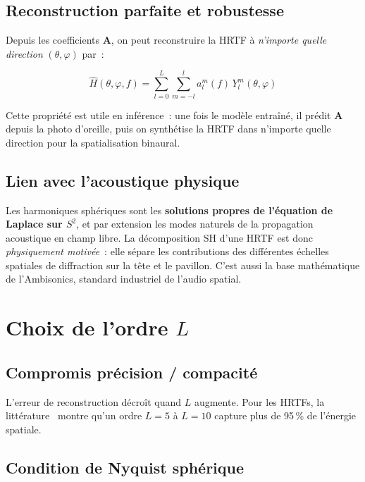 \documentclass[12pt, a4paper]{article}
\begin{document}
\subsection{Reconstruction parfaite et robustesse}

Depuis les coefficients $\mathbf{A}$, on peut reconstruire la HRTF à
\emph{n'importe quelle direction} $(\theta, \varphi)$ par~:

\begin{equation}
    \hat{H}(\theta, \varphi, f) = \sum_{l=0}^{L} \sum_{m=-l}^{l}
    a_l^m(f)\, Y_l^m(\theta, \varphi)
\end{equation}

Cette propriété est utile en inférence~: une fois le modèle entraîné, il prédit
$\mathbf{A}$ depuis la photo d'oreille, puis on synthétise la HRTF dans
n'importe quelle direction pour la spatialisation binaural.

\subsection{Lien avec l'acoustique physique}

Les harmoniques sphériques sont les \textbf{solutions propres de l'équation de
Laplace sur $S^2$}, et par extension les modes naturels de la propagation
acoustique en champ libre. La décomposition SH d'une HRTF est donc
\emph{physiquement motivée}~: elle sépare les contributions des différentes
échelles spatiales de diffraction sur la tête et le pavillon. C'est aussi la base
mathématique de l'Ambisonics, standard industriel de l'audio spatial.

\section{Choix de l'ordre $L$}

\subsection{Compromis précision / compacité}

L'erreur de reconstruction décroît quand $L$ augmente. Pour les HRTFs, la
littérature~\cite{Evans98, Zotkin09} montre qu'un ordre $L = 5$ à $L = 10$
capture plus de 95\,\% de l'énergie spatiale.

\subsection{Condition de Nyquist sphérique}
\end{document}

